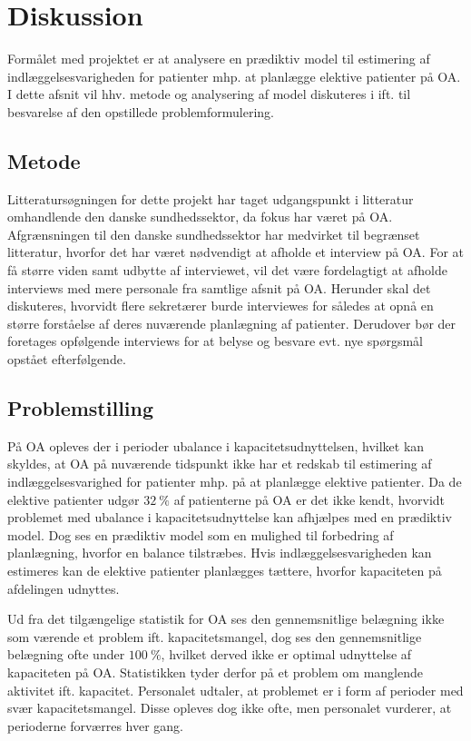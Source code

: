 \section{Diskussion} \label{diskussion}
Formålet med projektet er at analysere en prædiktiv model til estimering af indlæggelsesvarigheden for patienter mhp. at planlægge elektive patienter på OA. I dette afsnit vil hhv. metode og analysering af model diskuteres i ift. til besvarelse af den opstillede problemformulering. \\


\subsection{Metode}
Litteratursøgningen for dette projekt har taget udgangspunkt i litteratur omhandlende den danske sundhedssektor, da fokus har været på OA. Afgrænsningen til den danske sundhedssektor har medvirket til begrænset litteratur, hvorfor det har været nødvendigt at afholde et interview på OA. 
For at få større viden samt udbytte af interviewet, vil det være fordelagtigt at afholde interviews med mere personale fra samtlige afsnit på OA. Herunder skal det diskuteres, hvorvidt flere sekretærer burde interviewes for således at opnå en større forståelse af deres nuværende planlægning af patienter. Derudover bør der foretages opfølgende interviews for at belyse og besvare evt. nye spørgsmål opstået efterfølgende. 


\subsection{Problemstilling}
På OA opleves der i perioder ubalance i kapacitetsudnyttelsen, hvilket kan skyldes, at OA på nuværende tidspunkt ikke har et redskab til estimering af indlæggelsesvarighed for patienter mhp. på at planlægge elektive patienter. Da de elektive patienter udgør $32~ \%$ af patienterne på OA er det ikke kendt, hvorvidt problemet med ubalance i kapacitetsudnyttelse kan afhjælpes med en prædiktiv model. Dog ses en prædiktiv model som en mulighed til forbedring af planlægning, hvorfor en balance tilstræbes. Hvis indlæggelsesvarigheden kan estimeres kan de elektive patienter planlægges tættere, hvorfor kapaciteten på afdelingen udnyttes. 


Ud fra det tilgængelige statistik for OA ses den gennemsnitlige belægning ikke som værende et problem ift. kapacitetsmangel, dog ses den gennemsnitlige belægning ofte under $100~\%$, hvilket derved ikke er optimal udnyttelse af kapaciteten på OA. Statistikken tyder derfor på et problem om manglende aktivitet ift. kapacitet. Personalet udtaler, at problemet er i form af perioder med svær kapacitetsmangel. Disse opleves dog ikke ofte, men personalet vurderer, at perioderne forværres hver gang. 


